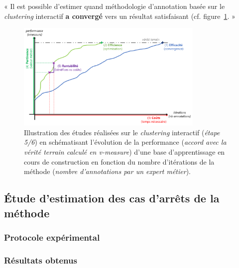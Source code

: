		\begin{tcolorbox}[
			title=\textbf{Hypothèse de rentabilité},
			colback=gray!20,
			colframe=gray!50!black!75,
			width=\linewidth
		]
			« Il est possible d'estimer quand méthodologie d'annotation basée sur le \textit{clustering} interactif \textbf{a convergé} vers un résultat satisfaisant (cf. figure~\ref{figure:HYPOTHESE-RENTABILITE}. »
			
			
			\begin{figure}[H]
				\centering
				\includegraphics[width=0.8\textwidth]{figures/hypotheses-05-rentabilite}
				\caption{Illustration des études réalisées sur le \textit{clustering} interactif (\textit{étape 5/6}) en schématisant l'évolution de la performance (\textit{accord avec la vérité terrain calculé en v-measure}) d'une base d'apprentissage en cours de construction en fonction du nombre d'itérations de la méthode (\textit{nombre d'annotations par un expert métier}).}
				\label{figure:HYPOTHESE-RENTABILITE}
			\end{figure}

		\end{tcolorbox}
		
		\subsection{Étude d'estimation des cas d'arrêts de la méthode}
		
			\subsubsection{Protocole expérimental}

			\subsubsection{Résultats obtenus}

